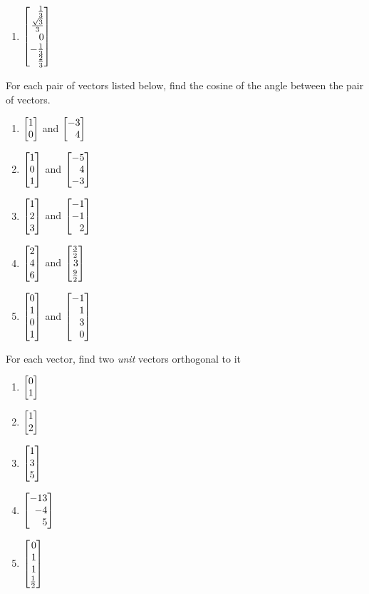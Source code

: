 \begin{exercises}
\begin{problist}
\begin{enumerate}
			\item $\mat{\frac{1}{3}\\\frac{\sqrt{3}}{3}\\0\\-\frac{1}{3}\\\frac{2}{3}}$
		\end{enumerate}
		\prob For each pair of vectors listed below, find the cosine of the angle between the pair of vectors.
		\begin{enumerate}
			\item $\mat{1\\0}$ and $\mat{-3\\4}$
			\item $\mat{1\\0\\1}$ and $\mat{-5\\4\\-3}$
			\item $\mat{1\\2\\3}$ and $\mat{-1\\-1\\2}$
			\item $\mat{2\\4\\6}$ and $\mat{\frac{3}{2}\\3\\\frac{9}{2}}$
			\item $\mat{0\\1\\0\\1}$ and $\mat{-1\\1\\3\\0}$
		\end{enumerate}
		\prob For each vector, find two \emph{unit} vectors orthogonal to it
		\begin{enumerate}
			\item $\mat{0\\1}$
			\item $\mat{1\\2}$
			\item $\mat{1\\3\\5}$
			\item $\mat{-13\\-4\\5}$
			\item $\mat{0\\1\\1\\\frac{1}{2}}$
		\end{enumerate}


\end{problist}
\end{exercises}
